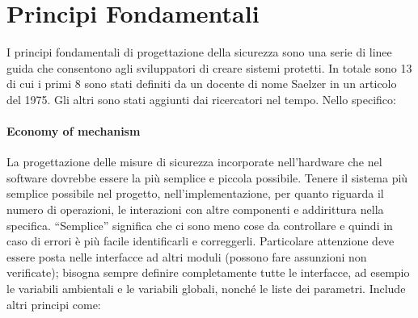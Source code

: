 \section{Principi Fondamentali}

I principi fondamentali di progettazione della sicurezza sono una serie di linee guida che consentono agli sviluppatori di creare sistemi protetti. In totale sono 13 di cui i primi 8 sono stati definiti da un docente di nome
Saelzer in un articolo del 1975. Gli altri sono stati
aggiunti dai ricercatori nel tempo. Nello specifico:

\paragraph{Economy of mechanism}
La progettazione delle misure di sicurezza incorporate
nell'hardware che nel software dovrebbe essere la più semplice e piccola possibile.
Tenere il sistema più semplice possibile nel progetto, nell'implementazione,
per quanto riguarda il
numero di operazioni, le interazioni con altre componenti e addirittura nella
specifica. ``Semplice''
significa che ci sono meno cose da controllare e quindi in caso di errori è più
facile identificarli e
correggerli.
Particolare attenzione deve essere posta nelle interfacce ad altri moduli
(possono fare assunzioni
non verificate); bisogna sempre definire completamente tutte le interfacce,
ad esempio le variabili
ambientali e le variabili globali, nonché le liste dei parametri.
Include altri principi come:

